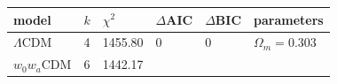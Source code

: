 \begin{longtable}[]{@{}llllll@{}}
\toprule
\begin{minipage}[b]{0.29\columnwidth}\raggedright
model\strut
\end{minipage} & \begin{minipage}[b]{0.04\columnwidth}\raggedright
\(k\)\strut
\end{minipage} & \begin{minipage}[b]{0.11\columnwidth}\raggedright
\(\chi^2\)\strut
\end{minipage} & \begin{minipage}[b]{0.10\columnwidth}\raggedright
\(\Delta\)AIC\strut
\end{minipage} & \begin{minipage}[b]{0.10\columnwidth}\raggedright
\(\Delta\)BIC\strut
\end{minipage} & \begin{minipage}[b]{0.20\columnwidth}\raggedright
parameters\strut
\end{minipage}\tabularnewline
\midrule
\endhead
\begin{minipage}[t]{0.29\columnwidth}\raggedright
\(\Lambda\)CDM\strut
\end{minipage} & \begin{minipage}[t]{0.04\columnwidth}\raggedright
4\strut
\end{minipage} & \begin{minipage}[t]{0.11\columnwidth}\raggedright
1455.80\strut
\end{minipage} & \begin{minipage}[t]{0.10\columnwidth}\raggedright
0\strut
\end{minipage} & \begin{minipage}[t]{0.10\columnwidth}\raggedright
0\strut
\end{minipage} & \begin{minipage}[t]{0.20\columnwidth}\raggedright
\(\Omega_m=0.303\)\strut
\end{minipage}\tabularnewline
\begin{minipage}[t]{0.29\columnwidth}\raggedright
\(w_0w_a\)CDM\strut
\end{minipage} & \begin{minipage}[t]{0.04\columnwidth}\raggedright
6\strut
\end{minipage} & \begin{minipage}[t]{0.11\columnwidth}\raggedright
1442.17\strut
\end{minipage} & \begin{minipage}[t]{0.10\columnwidth}\raggedright

\end{minipage}
\end{longtable}
